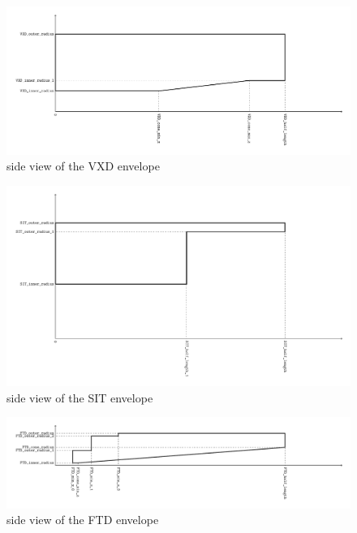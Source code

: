 \documentclass[a4paper]{article}
\begin{document}
\begin{figure}[th]
  \centering
  \includegraphics[width=1.3\columnwidth]{VXD_rz_envelope}
  \caption{side view of the VXD envelope}
  \label{ild:fig:vxd_env_rz}
\end{figure}

\begin{figure}[th]
  \centering
  \includegraphics[width=1.3\columnwidth]{SIT_rz_envelope}
  \caption{side view of the SIT envelope}
  \label{ild:fig:sit_env_rz}
\end{figure}

\begin{figure}[th]
  \centering
  \includegraphics[width=1.3\columnwidth]{FTD_rz_envelope}
  \caption{side view of the FTD envelope}
  \label{ild:fig:ftd_env_rz}
\end{figure}
\end{document}

